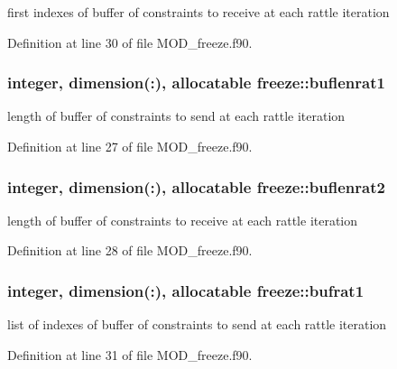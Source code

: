 first indexes of buffer of constraints to receive at each rattle iteration 



Definition at line 30 of file M\-O\-D\-\_\-freeze.\-f90.

\hypertarget{classfreeze_a03593d28905d3b9be544fe1ff812476c}{
\subsubsection[{buflenrat1}]{\setlength{\rightskip}{0pt plus 5cm}integer, dimension(\-:), allocatable freeze\-::buflenrat1}}\label{classfreeze_a03593d28905d3b9be544fe1ff812476c}


length of buffer of constraints to send at each rattle iteration 



Definition at line 27 of file M\-O\-D\-\_\-freeze.\-f90.

\hypertarget{classfreeze_a499d4830e088de939ad8fdb230bfe30c}{
\subsubsection[{buflenrat2}]{\setlength{\rightskip}{0pt plus 5cm}integer, dimension(\-:), allocatable freeze\-::buflenrat2}}\label{classfreeze_a499d4830e088de939ad8fdb230bfe30c}


length of buffer of constraints to receive at each rattle iteration 



Definition at line 28 of file M\-O\-D\-\_\-freeze.\-f90.

\hypertarget{classfreeze_aee10fb1491d873aef4531b069c5736a1}{
\subsubsection[{bufrat1}]{\setlength{\rightskip}{0pt plus 5cm}integer, dimension(\-:), allocatable freeze\-::bufrat1}}\label{classfreeze_aee10fb1491d873aef4531b069c5736a1}


list of indexes of buffer of constraints to send at each rattle iteration 



Definition at line 31 of file M\-O\-D\-\_\-freeze.\-f90.

